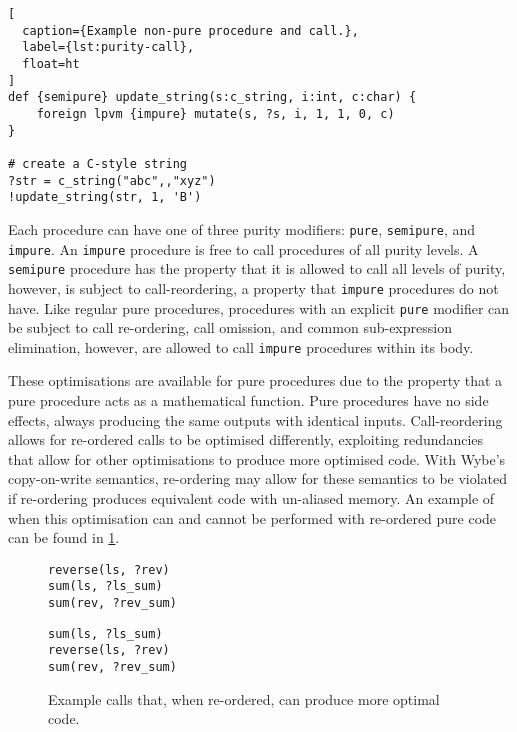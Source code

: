 \begin{lstlisting}[
  caption={Example non-pure procedure and call.},
  label={lst:purity-call},
  float=ht
]
def {semipure} update_string(s:c_string, i:int, c:char) {
    foreign lpvm {impure} mutate(s, ?s, i, 1, 1, 0, c)
}

# create a C-style string
?str = c_string("abc",,"xyz")
!update_string(str, 1, 'B') 
\end{lstlisting}

Each procedure can have one of three purity modifiers: \texttt{pure}, \texttt{semipure}, and \texttt{impure}. An \texttt{impure} procedure is free to call procedures of all purity levels. A \texttt{semipure} procedure has the property that it is allowed to call all levels of purity, however, is subject to call-reordering, a property that \texttt{impure} procedures do not have. Like regular pure procedures, procedures with an explicit \texttt{pure} modifier can be subject to call re-ordering, call omission, and common sub-expression elimination, however, are allowed to call \texttt{impure} procedures within its body. 

These optimisations are available for pure procedures due to the property that a pure procedure acts as a mathematical function. Pure procedures have no side effects, always producing the same outputs with identical inputs. Call-reordering allows for re-ordered calls to be optimised differently, exploiting redundancies that allow for other optimisations to produce more optimised code. With Wybe's copy-on-write semantics, re-ordering may allow for these semantics to be violated if re-ordering produces equivalent code with un-aliased memory. An example of when this optimisation can and cannot be performed with re-ordered pure code can be found in \cref{lst:purity-order}.

\begin{figure}
  \begin{minipage}[t]{.48\textwidth}
    \begin{lstlisting}
reverse(ls, ?rev)
sum(ls, ?ls_sum)
sum(rev, ?rev_sum)
\end{lstlisting}
    \label{slst:purity-rev-bad}
  \end{minipage}\hfill
  \begin{minipage}[t]{.48\textwidth}
    \begin{lstlisting}[numbers=none]
sum(ls, ?ls_sum)
reverse(ls, ?rev)
sum(rev, ?rev_sum)
\end{lstlisting}
    \label{slst:purity-rev-good}
  \end{minipage}
  \caption{Example calls that, when re-ordered, can produce more optimal code.}
  \label{lst:purity-order}
\end{figure}

